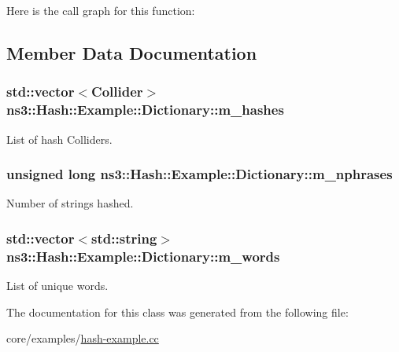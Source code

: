 Here is the call graph for this function\+:




\subsection{Member Data Documentation}
\subsubsection[{\texorpdfstring{m\+\_\+hashes}{m_hashes}}]{\setlength{\rightskip}{0pt plus 5cm}std\+::vector$<${\bf Collider}$>$ ns3\+::\+Hash\+::\+Example\+::\+Dictionary\+::m\+\_\+hashes\hspace{0.3cm}{\ttfamily [private]}}\hypertarget{classns3_1_1Hash_1_1Example_1_1Dictionary_a5e564c355e42a6db27cb8a8d756dfecd}{}\label{classns3_1_1Hash_1_1Example_1_1Dictionary_a5e564c355e42a6db27cb8a8d756dfecd}
List of hash Colliders. 
\subsubsection[{\texorpdfstring{m\+\_\+nphrases}{m_nphrases}}]{\setlength{\rightskip}{0pt plus 5cm}unsigned {\bf long} ns3\+::\+Hash\+::\+Example\+::\+Dictionary\+::m\+\_\+nphrases\hspace{0.3cm}{\ttfamily [private]}}\hypertarget{classns3_1_1Hash_1_1Example_1_1Dictionary_a9b178dadc9f65ac92d4be0e0cee4eea8}{}\label{classns3_1_1Hash_1_1Example_1_1Dictionary_a9b178dadc9f65ac92d4be0e0cee4eea8}
Number of strings hashed. 
\subsubsection[{\texorpdfstring{m\+\_\+words}{m_words}}]{\setlength{\rightskip}{0pt plus 5cm}std\+::vector$<$std\+::string$>$ ns3\+::\+Hash\+::\+Example\+::\+Dictionary\+::m\+\_\+words\hspace{0.3cm}{\ttfamily [private]}}\hypertarget{classns3_1_1Hash_1_1Example_1_1Dictionary_a514e44a90c8fd635bfa98501531e088d}{}\label{classns3_1_1Hash_1_1Example_1_1Dictionary_a514e44a90c8fd635bfa98501531e088d}
List of unique words. 

The documentation for this class was generated from the following file\+:\begin{DoxyCompactItemize}
\item 
core/examples/\hyperlink{hash-example_8cc}{hash-\/example.\+cc}\end{DoxyCompactItemize}
